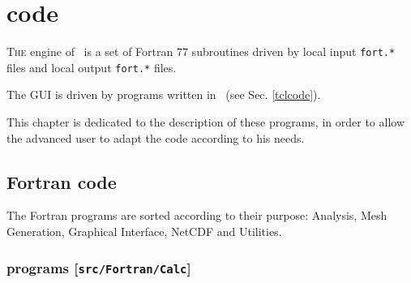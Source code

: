 \chapter[\diva\divaspace code]{\diva\divaspace code}
\hypertarget{DIVACODE}{}

\lettrine[lines=2]{T}{he} engine of \diva\, is a set of Fortran $77$ subroutines driven by local input \texttt{fort.*} files and local output \texttt{fort.*} files.

The GUI is driven by programs written in \hyperlink{TCL}{\tcltk}\, (see Sec. \ref{tclcode}).

This chapter is dedicated to the description of these programs, in order to allow the advanced user to adapt the code according to his needs.

\minitoc


\section[Fortran code]{Fortran code \expert}

The Fortran programs are sorted according to their purpose: Analysis, Mesh Generation, Graphical Interface, NetCDF and Utilities.

\subsection[\diva\divaspace programs]{\diva\divaspace programs [\texttt{src/Fortran/Calc}]}

